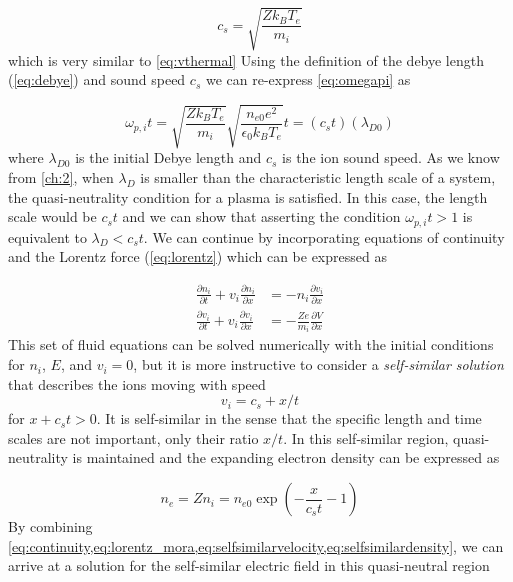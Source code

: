 \begin{equation}
	c_s = \sqrt{\frac{Z k_B T_e}{m_i}} \label{eq:soundspeed}
\end{equation}
which is very similar to \autoref{eq:vthermal} Using the definition of the debye length (\autoref{eq:debye}) and sound speed $c_s$ we can re-express \cref{eq:omegapi} as 

\begin{equation}
	\omega_{p,i} t = \sqrt{\frac{Z k_B T_e}{m_i}} \sqrt{\frac{n_{e0} e^2}{\epsilon_0 k_B T_e}} t = (c_s t) (\lambda_{D0})
\end{equation}
where $\lambda_{D0}$ is the initial Debye length and $c_s$ is the ion sound speed. As we know from \autoref{ch:2}, when $\lambda_D$ is smaller than the characteristic length scale of a system, the quasi-neutrality condition for a plasma is satisfied. In this case, the length scale would be $c_s t$ and we can show that asserting the condition $\omega_{p,i} t > 1$ is equivalent to $\lambda_D < c_s t$. We can continue by incorporating equations of continuity and the Lorentz force (\autoref{eq:lorentz}) which can be expressed as 

\begin{subequations}
	\begin{align}
		\frac{\partial n_i}{\partial t} + v_i \frac{\partial n_i}{\partial x} &= - n_i \frac{\partial v_i}{\partial x} \label{eq:continuity} \\
		\frac{\partial v_i}{\partial t} + v_i \frac{\partial v_i}{\partial x} &= -\frac{Z e}{m_i} \frac{\partial V}{\partial x} \label{eq:lorentz_mora}
	\end{align}
\end{subequations}
This set of fluid equations can be solved numerically with the initial conditions for $n_i$, $E$, and $v_i = 0$, but it is more instructive to consider a \emph{self-similar solution} that describes the ions moving with speed 
\begin{equation}
	v_i = c_s + x/t \label{eq:selfsimilarvelocity}
\end{equation}
for $x + c_s t > 0$. It is self-similar in the sense that the specific length and time scales are not important, only their ratio $x/t$. In this self-similar region, quasi-neutrality is maintained and the expanding electron density can be expressed as

\begin{equation}
	n_e = Z n_i = n_{e 0} \exp(-\frac{x}{c_s t} - 1) \label{eq:selfsimilardensity}
\end{equation} 
By combining \cref{eq:continuity,eq:lorentz_mora,eq:selfsimilarvelocity,eq:selfsimilardensity}, we can arrive at a solution for the self-similar electric field in this quasi-neutral region

